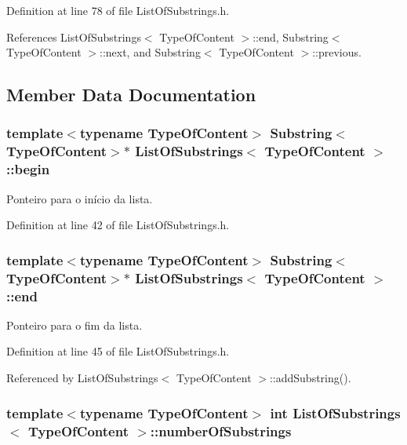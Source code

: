 Definition at line 78 of file List\+Of\+Substrings.\+h.



References List\+Of\+Substrings$<$ Type\+Of\+Content $>$\+::end, Substring$<$ Type\+Of\+Content $>$\+::next, and Substring$<$ Type\+Of\+Content $>$\+::previous.



\subsection{Member Data Documentation}
\hypertarget{classListOfSubstrings_aca3c37e86411bf80050bece7a1ec0df0}{
\subsubsection[{begin}]{\setlength{\rightskip}{0pt plus 5cm}template$<$typename Type\+Of\+Content$>$ {\bf Substring}$<$Type\+Of\+Content$>$$\ast$ {\bf List\+Of\+Substrings}$<$ Type\+Of\+Content $>$\+::begin}}\label{classListOfSubstrings_aca3c37e86411bf80050bece7a1ec0df0}


Ponteiro para o início da lista. 



Definition at line 42 of file List\+Of\+Substrings.\+h.

\hypertarget{classListOfSubstrings_a4b4c8edcbdf74d6c6b0e21551e504b98}{
\subsubsection[{end}]{\setlength{\rightskip}{0pt plus 5cm}template$<$typename Type\+Of\+Content$>$ {\bf Substring}$<$Type\+Of\+Content$>$$\ast$ {\bf List\+Of\+Substrings}$<$ Type\+Of\+Content $>$\+::end}}\label{classListOfSubstrings_a4b4c8edcbdf74d6c6b0e21551e504b98}


Ponteiro para o fim da lista. 



Definition at line 45 of file List\+Of\+Substrings.\+h.



Referenced by List\+Of\+Substrings$<$ Type\+Of\+Content $>$\+::add\+Substring().

\hypertarget{classListOfSubstrings_afbd8ea432d107cd2f1285c9fe5dd9b96}{
\subsubsection[{number\+Of\+Substrings}]{\setlength{\rightskip}{0pt plus 5cm}template$<$typename Type\+Of\+Content$>$ int {\bf List\+Of\+Substrings}$<$ Type\+Of\+Content $>$\+::number\+Of\+Substrings}}\label{classListOfSubstrings_afbd8ea432d107cd2f1285c9fe5dd9b96}



